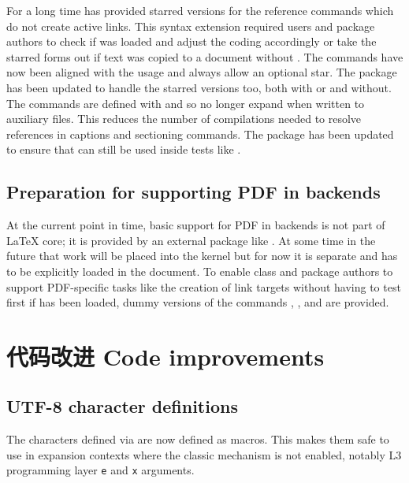 \documentclass{ltnews}
\newcommand*\thbox{\texorpdfstring\hbox{}}
\begin{document}
For a long time  has provided starred versions for the reference commands
which do not create active links. This syntax extension required users and
package authors to check if  was loaded and adjust the coding
accordingly or take the starred forms out if text was copied to a document
without . The commands have now been aligned with
the  usage and always allow an optional star. The  package
has been updated to handle the starred versions too, both with  or 
and without. The commands are defined with  and so no longer expand when
written to auxiliary files. This reduces the number of compilations needed to resolve references
in captions and sectioning commands. The package  has been updated to ensure that
 can still be used inside tests like .


\subsection{\thbox{为后端支持 PDF 做准备} Preparation for supporting PDF in backends}

At the current point in time, basic support for PDF in
backends is not part of \LaTeX{} core; it is provided by an external
package like .
At some time in the future that work will be placed
into the kernel but for now it is separate and has to be
explicitly loaded in the document. To enable class and package authors
to support PDF-specific tasks like the creation of link targets without
having to test first if  has been loaded, dummy versions of
the commands , ,  and
 are provided.

\section{代码改进 Code improvements}

\subsection{ UTF-8 character definitions}
The characters defined via  are now defined as 
macros. This makes them safe to use in expansion contexts where the
classic  mechanism is not enabled, notably L3 programming
layer \texttt{e} and \texttt{x} arguments.
\end{document}
